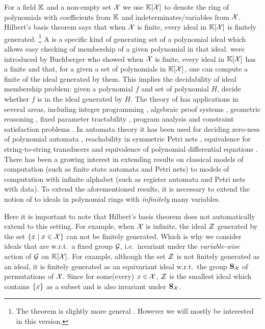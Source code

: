 For a field $\mathbb{K}$ and a non-empty set $\mathcal{X}$ we use $\mathbb{K}[\mathcal{X}]$ to denote the ring of polynomials with coefficients from $\mathbb{K}$ and indeterminates/variables from $\mathcal{X}$.
Hilbert's basis theorem says that when $\mathcal{X}$ is finite, every ideal in $\mathbb{K}[\mathcal{X}]$ is finitely generated.
\footnote{The theorem is slightly more general \cite[Theorem 4.1]{Lang02}. 
However we will mostly be interested in this version.}
A  is a specific kind of generating set of a polynomial ideal which allows easy checking of membership of a given polynomial in that ideal.
 were introduced by Buchberger who showed when $\mathcal{X}$ is finite,
every ideal in $\mathbb{K}[\mathcal{X}]$ has a finite  and that,
for a given a set of polynomials in $\mathbb{K}[\mathcal{X}]$,
one can compute a finite  of the ideal generated by them.
This implies the decidability of ideal membership problem:
given a polynomial $f$ and set of polynomial $H$, decide whether $f$ is in the ideal generated by $H$.
The theory of  has applications in several areas,
including
integer programming \cite{Sturmfels96},
algebraic proof systems \cite{algProof},
geometric reasoning \cite{Cox2015chGeom},
fixed parameter tractability \cite{ACDM22},
program analysis \cite{SSM04}
and constraint satisfaction problems \cite{Mas21}.
In automata theory it has been used for deciding zero-ness of polynomial automata \cite{BEDUSHWO17},
reachability in symmetric Petri nets \cite{MAME82},
equivalence for string-to-string transducers \cite{HONKALA00}
and equivalence of polynomial differential equations \cite{CLEMENTE24}.
There has been a growing interest in extending results on classical models of computation (such as finite state automata and Petri nets) to models of computation with infinite alphabet (such as register automata and Petri nets with data).
To extend the aforementioned results,
it is necessary to extend the notion of  to ideals in polynomial rings with \emph{infinitely} many variables.

Here it is important to note that Hilbert's basis theorem does not automatically extend to this setting.
For example, when $\mathcal{X}$ is infinite,
the ideal $\mathcal{Z}$ generated by the set $\{ x \mid x\in\mathcal{X} \}$ can not be finitely generated.
Which is why we consider ideals that are  w.r.t.\ a fixed group $\mathcal{G}$,
i.e.\ invariant under the \emph{variable-wise} action of $\mathcal{G}$ on $\mathbb{K}[\mathcal{X}]$.
For example, although the set $\mathcal{Z}$ is not finitely generated as an ideal,
it is finitely generated as an equivariant ideal w.r.t.\ the group $\mathbf{S}_{\mathcal{X}}$ of permutations of $\mathcal{X}$.
Since for some(every) $x\in\mathcal{X}$,
$\mathcal{Z}$ is the smallest ideal which contains $\{ x \}$ as a subset and is also invariant under $\mathbf{S}_{\mathcal{X}}$.

